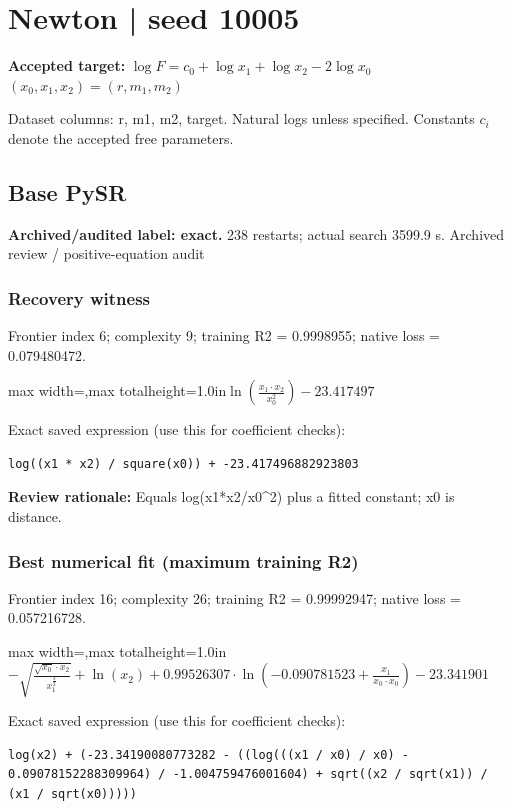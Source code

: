 \documentclass[10pt,letterpaper,landscape]{article}
\begin{document}
\section*{Newton | seed 10005}
\textbf{Accepted target:} $\displaystyle \log F=c_0+\log x_1+\log x_2-2\log x_0$\hfill $(x_0,x_1,x_2)=(r,m_1,m_2)$\par
{\small Dataset columns: r, m1, m2, target. Natural logs unless specified. Constants $c_i$ denote the accepted free parameters.}\par\medskip
\begin{minipage}[t]{0.485\textwidth}
\subsection*{Base PySR}
\textbf{Archived/audited label: exact.} 238 restarts; actual search 3599.9 s.
{\small Archived review / positive-equation audit}
\subsubsection*{Recovery witness}
Frontier index 6; complexity 9; training R2 = 0.9998955; native loss = 0.079480472.
\begin{center}\begin{adjustbox}{max width=\linewidth,max totalheight=1.0in}$\displaystyle \ln{\left(\frac{x_{1} \cdot x_{2}}{x_{0}^{2}} \right)} - 23.417497$\end{adjustbox}\end{center}
{\scriptsize Exact saved expression (use this for coefficient checks):}
\begin{lstlisting}
log((x1 * x2) / square(x0)) + -23.417496882923803
\end{lstlisting}
{\small\textbf{Review rationale:} Equals log(x1*x2/x0\textasciicircum{}2) plus a fitted constant; x0 is distance.}
\subsubsection*{Best numerical fit (maximum training R2)}
Frontier index 16; complexity 26; training R2 = 0.99992947; native loss = 0.057216728.
\begin{center}\begin{adjustbox}{max width=\linewidth,max totalheight=1.0in}$\displaystyle - \sqrt{\frac{\sqrt{x_{0}} \cdot x_{2}}{x_{1}^{\frac{3}{2}}}} + \ln{\left(x_{2} \right)} + 0.99526307 \cdot \ln{\left(-0.090781523 + \frac{x_{1}}{x_{0} \cdot x_{0}} \right)} - 23.341901$\end{adjustbox}\end{center}
{\scriptsize Exact saved expression (use this for coefficient checks):}
\begin{lstlisting}
log(x2) + (-23.34190080773282 - ((log(((x1 / x0) / x0) - 0.09078152288309964) / -1.004759476001604) + sqrt((x2 / sqrt(x1)) / (x1 / sqrt(x0)))))
\end{lstlisting}
\end{minipage}\hfill
\end{document}

